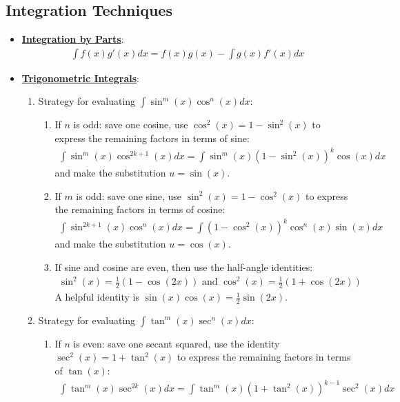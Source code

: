 \documentclass[reqno,11pt]{amsart}
\theoremstyle{definition}
\theoremstyle{remark}
\newcommand{\dfn}[1]{\underline{\textbf{#1}}}
\begin{document}
\subsection{Integration Techniques}
\begin{itemize}[noitemsep]
	\item \dfn{Integration by Parts}: 
	\begin{align}
		\int f(x) g'(x) dx = f(x) g(x) - \int g(x) f'(x) dx 	
	\end{align}
	\item \dfn{Trigonometric Integrals}: 
	\begin{enumerate}[noitemsep]
		\item Strategy for evaluating $\int \sin^m(x) \cos^n (x) dx$: 
		\begin{enumerate}[noitemsep]
			\item If $n$ is odd: save one cosine, use $\cos^2(x) = 1-\sin^2(x)$ to express the remaining factors in terms of sine: 
			\begin{align}
				\int \sin^m(x) \cos^{2k+1}(x) dx = \int \sin^m(x) (1-\sin^2(x))^k \cos(x) dx 	
			\end{align}
			and make the substitution $u=\sin(x)$. 
			\item If $m$ is odd: save one sine, use $\sin^2(x) = 1 - \cos^2(x)$ to express the remaining factors in terms of cosine: 
			\begin{align}
				\int \sin^{2k+1}(x) \cos^n (x) dx = \int (1-\cos^2(x))^k \cos^n (x) \sin (x) dx 	
			\end{align}
			and make the substitution $u = \cos(x)$.
			\item If sine and cosine are even, then use the half-angle identities: 
			\begin{align}
				\sin^2(x) = \frac{1}{2} ( 1 - \cos (2x)) \text{ and } \cos^2(x) = \frac{1}{2} ( 1 + \cos(2x)) 	
			\end{align}
			A helpful identity is $\sin (x) \cos(x) = \frac{1}{2} \sin (2x)$. 
		\end{enumerate}
		\item Strategy for evaluating $\int \tan^m (x) \sec^n(x) dx$: 
		\begin{enumerate}[noitemsep]
			\item If $n$ is even: save one secant squared, use the identity $\sec^2(x) = 1 + \tan^2(x)$ to express the remaining factors in terms of $\tan (x)$: 
			\begin{align}
				\int \tan^m(x) \sec^{2k} (x) dx = \int \tan^m(x) (1+\tan^2(x))^{k-1} \sec^2(x) dx 	

\end{align}
\end{enumerate}
\end{enumerate}
\end{itemize}
\end{document}
